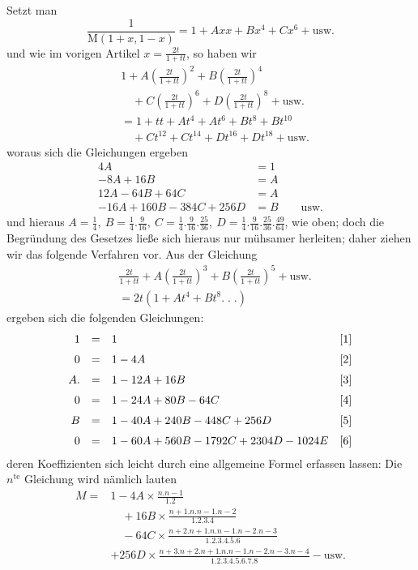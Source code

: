 \begingroup
\renewcommand{\arraystretch}{1.45}

Setzt man
\[
\frac1{\mathrm{M}(1+x,1-x)}=1+Axx+Bx^4+Cx^6+\text{usw.}
\]
und wie im vorigen Artikel \(x=\frac{2t}{1+tt}\), so haben wir
\[
\begin{aligned}
&1+A(\frac{2t}{1+tt})^2+B(\frac{2t}{1+tt})^4\\&\quad+C(\frac{2t}{1+tt})^6+D(\frac{2t}{1+tt})^8+\text{usw.}\\[6pt]
&=1+tt+At^4+At^6+Bt^8+Bt^{10}\\&\quad+Ct^{12}+Ct^{14}+Dt^{16}+Dt^{18}+\text{usw.}
\end{aligned}
\]
woraus sich die Gleichungen ergeben
\[
\begin{aligned}
4A&=1\\[6pt]
-8A+16B&=A\\[6pt]
12A-64B+64C&=A\\[6pt]
-16A+160B-384C+256D&=B\qquad\text{usw.}
\end{aligned}
\]
und hieraus \(A=\frac14,\allowbreak \ B=\frac14.\frac9{16},\allowbreak \ C=\frac14.\frac9{16}.\frac{25}{36},\allowbreak \ D=\frac14.\frac9{16}.\frac{25}{36}.\frac{49}{64}\), wie oben;
doch die Begründung des Gesetzes ließe sich hieraus nur mühsamer herleiten; daher ziehen wir das folgende Verfahren vor. Aus der Gleichung
\[
\begin{aligned}&\frac{2t}{1+tt}+A(\frac{2t}{1+tt})^3+B(\frac{2t}{1+tt})^5+\text{usw.}\\&=2t(1+At^4+Bt^8.\;.\;.)\end{aligned}
\]
ergeben sich die folgenden Gleichungen:
\[
\begin{array}{@{}rcl@{\quad}r@{}}
1&=&1&[1]\\[6pt]
0&=&1-4A&[2]\\[6pt]
A.&=&1-12A+16B&[3]\\[6pt]
0&=&1-24A+80B-64C&[4]\\[6pt]
B&=&1-40A+240B-448C+256D&[5]\\[6pt]
0&=&1-60A+560B-1792C+2304D-1024E&[6]
\end{array}
\]
deren Koeffizienten sich leicht durch eine allgemeine Formel erfassen lassen: Die \(n^{\mathrm{te}}\) Gleichung wird nämlich lauten
\[
\begin{aligned}
M={}&1-4A\times\frac{n.n-1}{1.2}\\&\quad+16B\times\frac{n+1.n.n-1.n-2}{1.2.3.4}\\&\quad-64C\times\frac{n+2.n+1.n.n-1.n-2.n-3}{1.2.3.4.5.6}\\[6pt]
&+256D\times\frac{n+3.n+2.n+1.n.n-1.n-2.n-3.n-4}{1.2.3.4.5.6.7.8}-\text{usw.}
\end{aligned}
\]
